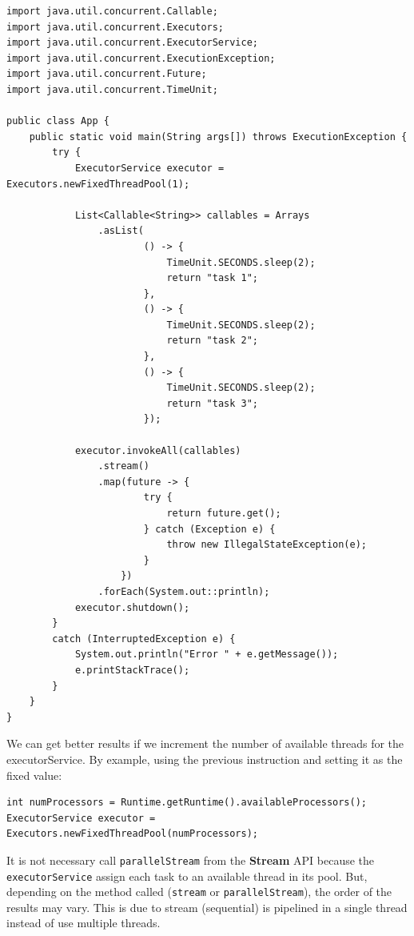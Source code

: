 \documentclass[openany, a4paper]{book}
\theoremstyle{break}
\theoremstyle{example}
\theoremstyle{note}
\theoremstyle{break}
\theoremstyle{exercise}
\begin{document}
\begin{verbatim}
import java.util.concurrent.Callable;
import java.util.concurrent.Executors;
import java.util.concurrent.ExecutorService;
import java.util.concurrent.ExecutionException;
import java.util.concurrent.Future;
import java.util.concurrent.TimeUnit;

public class App {
    public static void main(String args[]) throws ExecutionException {
        try {
            ExecutorService executor = Executors.newFixedThreadPool(1);

            List<Callable<String>> callables = Arrays
                .asList(
                        () -> {
                            TimeUnit.SECONDS.sleep(2);
                            return "task 1";
                        },
                        () -> {
                            TimeUnit.SECONDS.sleep(2);
                            return "task 2";
                        },
                        () -> {
                            TimeUnit.SECONDS.sleep(2);
                            return "task 3";
                        });

            executor.invokeAll(callables)
                .stream()
                .map(future -> {
                        try {
                            return future.get();
                        } catch (Exception e) {
                            throw new IllegalStateException(e);
                        }
                    })
                .forEach(System.out::println);
            executor.shutdown();
        }
        catch (InterruptedException e) {
            System.out.println("Error " + e.getMessage());
            e.printStackTrace();
        }
    }
}
\end{verbatim}

We can get better results if we increment the number of available threads
for the executorService. By example, using the previous instruction and
setting it as the fixed value:

\begin{verbatim}
int numProcessors = Runtime.getRuntime().availableProcessors();
ExecutorService executor = Executors.newFixedThreadPool(numProcessors);
\end{verbatim}

It is not necessary call \texttt{parallelStream} from the \textbf{Stream} API because the
\texttt{executorService} assign each task to an available thread in its pool. But,
depending on the method called (\texttt{stream} or \texttt{parallelStream}), the order of the
results may vary. This is due to stream (sequential) is pipelined in a
single thread instead of use multiple threads.
\end{document}
